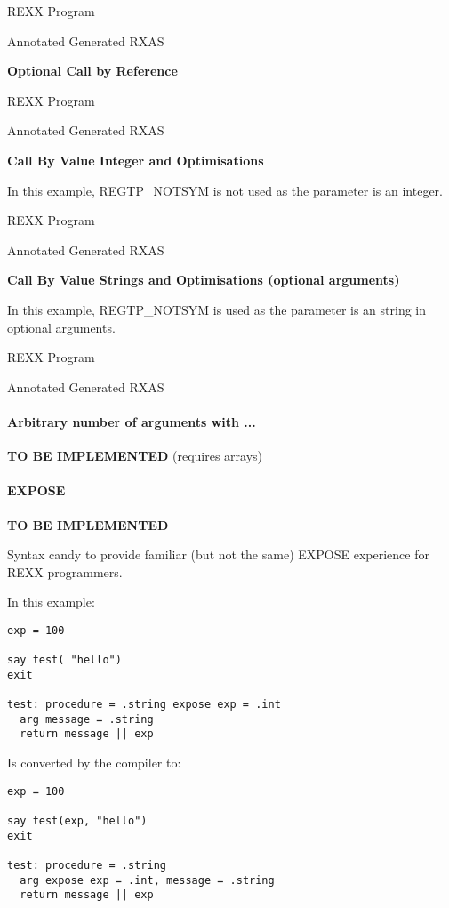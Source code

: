 REXX Program

Annotated Generated RXAS

\textbf{Optional Call by Reference}

REXX Program

Annotated Generated RXAS

\textbf{Call By Value Integer and Optimisations}

In this example, REGTP\_NOTSYM is not used as the parameter is an integer.

REXX Program

Annotated Generated RXAS

\textbf{Call By Value Strings and Optimisations (optional arguments)}

In this example, REGTP\_NOTSYM is used as the parameter is an string in optional arguments.

REXX Program

Annotated Generated RXAS

\paragraph{Arbitrary number of arguments with ...}

\textbf{TO BE IMPLEMENTED} (requires arrays)

\paragraph{EXPOSE}

\textbf{TO BE IMPLEMENTED}

Syntax candy to provide familiar (but not the same) EXPOSE experience for REXX programmers.

In this example:

\begin{verbatim}
exp = 100

say test( "hello")
exit

test: procedure = .string expose exp = .int
  arg message = .string
  return message || exp
\end{verbatim}

Is converted by the compiler to:

\begin{verbatim}
exp = 100

say test(exp, "hello")
exit

test: procedure = .string 
  arg expose exp = .int, message = .string
  return message || exp
\end{verbatim}

